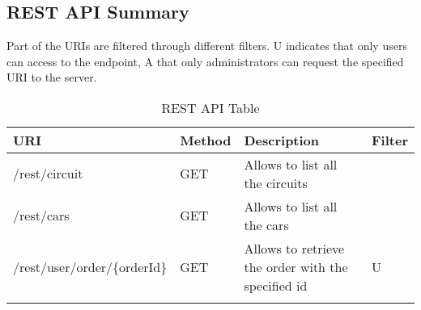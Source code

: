 \subsection{REST API Summary}

Part of the URIs are filtered through different filters. U indicates that only users can access to the endpoint,
A that only administrators can request the specified URI to the server.

\begin{longtable}{|p{}|p{} |p{}|p{}|}
\hline
\textbf{URI} & \textbf{Method} & \textbf{Description} & \textbf{Filter} \\ \hline
/rest/circuit & GET & Allows to list all the circuits & \\ \hline
/rest/cars & GET & Allows to list all the cars & \\ \hline
/rest/user/order/\{orderId\} & GET & Allows to retrieve the order with the specified id & U \\ \hline

\caption{REST API Table}
\label{tab:termGlossary}
\end{longtable}